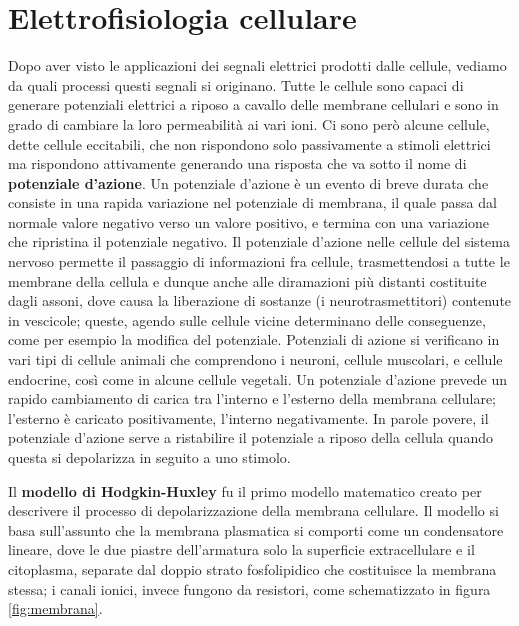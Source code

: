 \documentclass{report}
\newcommand{\figref}[1]{figura \ref{#1}}
\numberwithin{equation}{section}
\numberwithin{figure}{section}
\begin{document}
\section{Elettrofisiologia cellulare}
Dopo aver visto le applicazioni dei segnali elettrici prodotti dalle cellule, vediamo da quali processi questi segnali si originano. Tutte le cellule sono capaci di generare potenziali elettrici a riposo a cavallo delle membrane cellulari e sono in grado di cambiare la loro permeabilità ai vari ioni. Ci sono però alcune cellule, dette cellule eccitabili, che non rispondono solo passivamente a stimoli elettrici ma rispondono attivamente generando una risposta che va sotto il nome di \textbf{potenziale d’azione}. Un potenziale d'azione è un evento di breve durata che consiste in una rapida variazione nel potenziale di membrana, il quale passa dal normale valore negativo verso un valore positivo, e termina con una variazione che ripristina il potenziale negativo. Il potenziale d'azione nelle cellule del sistema nervoso permette il passaggio di informazioni fra cellule, trasmettendosi a tutte le membrane della cellula e dunque anche alle diramazioni più distanti costituite dagli assoni, dove causa la liberazione di sostanze (i neurotrasmettitori) contenute in vescicole; queste, agendo sulle cellule vicine determinano delle conseguenze, come per esempio la modifica del potenziale. Potenziali di azione si verificano in vari tipi di cellule animali che comprendono i neuroni, cellule muscolari, e cellule endocrine, così come in alcune cellule vegetali. Un potenziale d'azione prevede un rapido cambiamento di carica tra l'interno e l'esterno della membrana cellulare; l'esterno è caricato positivamente, l'interno negativamente. In parole povere, il potenziale d'azione serve a ristabilire il potenziale a riposo della cellula quando questa si depolarizza in seguito a uno stimolo.

Il \textbf{modello di Hodgkin-Huxley} fu il primo modello matematico creato per descrivere il processo di depolarizzazione della membrana cellulare. Il modello si basa sull'assunto che la membrana plasmatica si comporti come un condensatore lineare, dove le due piastre dell'armatura solo la superficie extracellulare e il citoplasma, separate dal doppio strato fosfolipidico che costituisce la membrana stessa; i canali ionici, invece fungono da resistori, come schematizzato in \figref{fig:membrana}.
\end{document}
